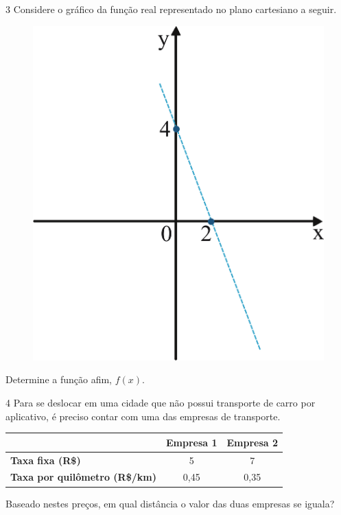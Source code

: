\pagebreak
\num{3} Considere o gráfico da função real representado no plano cartesiano a seguir.

\begin{figure}[htpb!]
\centering
\includegraphics[width=.4\textwidth]{./ilustras-mat/modulo_9-atividade_3.png}
\end{figure}

Determine a função afim, $f(x)$.

\begin{emptybox}
\vspace{2cm}
\end{emptybox}

\num{4} Para se deslocar em uma cidade que não possui transporte
de carro por aplicativo, é preciso contar com uma das empresas de transporte.

\begin{center}
\begin{tabular}{|l |c|c|}
\hline
 & \textbf{Empresa 1} & \textbf{Empresa 2} \\ \hline
\textbf{Taxa fixa (R\$)} & 5 & 7 \\ \hline
\textbf{Taxa por quilômetro (R\$/km)} & 0,45 & 0,35 \\ \hline
\end{tabular}
\end{center}

Baseado nestes preços, em qual distância o valor das duas 
empresas se iguala?

\begin{emptybox}
\end{emptybox}

